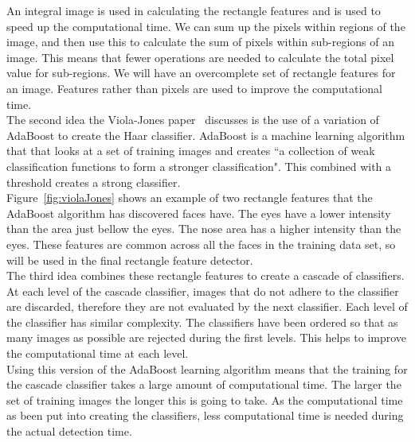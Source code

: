 \documentclass[10pt,a4paper,openbib]{article}
\begin{document}
\begin{multicols}{2}
\noindent An integral image is used in calculating the rectangle features and is used to speed up the computational time. We can sum up the pixels within regions of the image, and then use this to calculate the sum of pixels within sub-regions of an image. This means that fewer operations are needed to calculate the total pixel value for sub-regions. We will have an overcomplete set of rectangle features for an image. Features rather than pixels are used to improve the computational time. \\

\noindent The second idea the Viola-Jones paper~\cite{violaJones} discusses is the use of a variation of AdaBoost to create the Haar classifier. AdaBoost is a machine learning algorithm that that looks at a set of training images and creates \cite{violaJones} ``a collection of weak classification functions to form a stronger classification". This combined with a threshold creates a strong classifier. \\

\noindent Figure~\ref{fig:violaJones} shows an example of two rectangle features that the AdaBoost algorithm has discovered faces have. The eyes have a lower intensity than the area just bellow the eyes. The nose area has a higher intensity than the eyes. These features are common across all the faces in the training data set, so will be used in the final rectangle feature detector. \\

\noindent The third idea combines these rectangle features to create a cascade of classifiers. At each level of the cascade classifier, images that do not adhere to the classifier are discarded, therefore they are not evaluated by the next classifier. Each level of the classifier has similar complexity. The classifiers have been ordered so that as many images as possible are rejected during the first levels. This helps to improve the computational time at each level.  \\

\noindent Using this version of the AdaBoost learning algorithm means that the training for the cascade classifier takes a large amount of computational time. The larger the set of training images the longer this is going to take. As the computational time as been put into creating the classifiers, less computational time is needed during the actual detection time.


\end{multicols}
\end{document}
